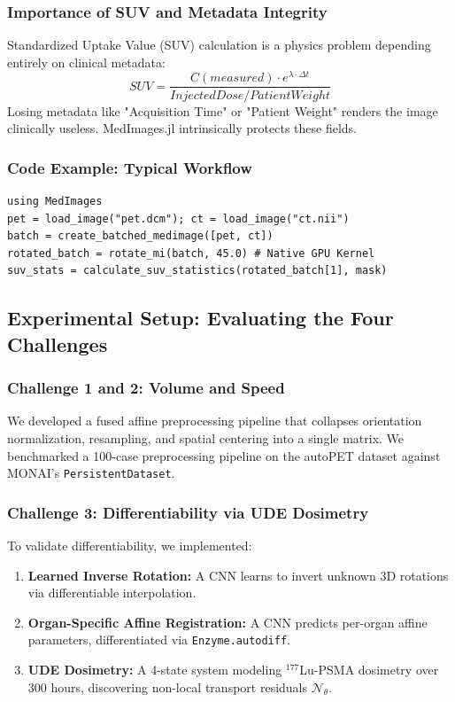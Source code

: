 \documentclass[10pt,letterpaper]{article}
\begin{document}
\subsubsection*{Importance of SUV and Metadata Integrity}
Standardized Uptake Value (SUV) calculation is a physics problem depending entirely on clinical metadata:
\begin{equation}
SUV = \frac{C(measured) \cdot e^{\lambda \cdot \Delta t}}{Injected Dose / Patient Weight}
\end{equation}
Losing metadata like "Acquisition Time" or "Patient Weight" renders the image clinically useless. MedImages.jl intrinsically protects these fields.

\subsubsection*{Code Example: Typical Workflow}
\begin{lstlisting}[basicstyle=\ttfamily\footnotesize]
using MedImages
pet = load_image("pet.dcm"); ct = load_image("ct.nii")
batch = create_batched_medimage([pet, ct])
rotated_batch = rotate_mi(batch, 45.0) # Native GPU Kernel
suv_stats = calculate_suv_statistics(rotated_batch[1], mask)
\end{lstlisting}

\subsection*{Experimental Setup: Evaluating the Four Challenges}

\subsubsection*{Challenge 1 and 2: Volume and Speed}
We developed a fused affine preprocessing pipeline that collapses orientation normalization, resampling, and spatial centering into a single matrix. We benchmarked a 100-case preprocessing pipeline on the autoPET dataset against MONAI's \texttt{PersistentDataset}.

\subsubsection*{Challenge 3: Differentiability via UDE Dosimetry}
To validate differentiability, we implemented:
\begin{enumerate}
    \item \textbf{Learned Inverse Rotation:} A CNN learns to invert unknown 3D rotations via differentiable interpolation.
    \item \textbf{Organ-Specific Affine Registration:} A CNN predicts per-organ affine parameters, differentiated via \texttt{Enzyme.autodiff}.
    \item \textbf{UDE Dosimetry:} A 4-state system modeling $^{177}$Lu-PSMA dosimetry over 300 hours, discovering non-local transport residuals $\mathcal{N}_\theta$.
\end{enumerate}
\end{document}
